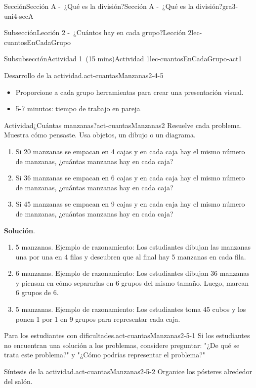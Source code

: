 \documentclass[oneside,10pt,]{article}
\newcommand{\blocktitlefont}{\relax}
\begin{document}
\begin{sectionptx}{Sección}{Sección A -~¿Qué es la división?}{}{Sección A -~¿Qué es la división?}{}{}{gra3-uni4-secA}
\begin{subsectionptx}{Subsección}{Lección 2 -~¿Cuántos hay en cada grupo?}{}{Lección 2}{}{}{lec-cuantosEnCadaGrupo}
\begin{subsubsectionptx}{Subsubsección}{Actividad 1~(15 mins)}{}{Actividad 1}{}{}{lec-cuantosEnCadaGrupo-act1}
\begin{paragraphs}{Desarrollo de la actividad.}{act-cuantasManzanas2-4-5}
\begin{itemize}[label=\textbullet]
\item{}Proporcione a cada grupo herramientas para crear una presentación visual.%
\item{}5-7 minutos: tiempo de trabajo en pareja%
\end{itemize}
\end{paragraphs}%
\begin{activity}{Actividad}{¿Cuántas manzanas?}{act-cuantasManzanas2}%
Resuelve cada problema. Muestra cómo pensaste. Usa objetos, un dibujo o un diagrama.%
\par
%
\begin{enumerate}
\item{}Si 20 manzanas se empacan en 4 cajas y en cada caja hay el mismo número de manzanas, ¿cuántas manzanas hay en cada caja?%
\item{}Si 36 manzanas se empacan en 6 cajas y en cada caja hay el mismo número de manzanas, ¿cuántas manzanas hay en cada caja?%
\item{}Si 45 manzanas se empacan en 9 cajas y en cada caja hay el mismo número de manzanas, ¿cuántas manzanas hay en cada caja?%
\end{enumerate}
%
\par\smallskip%
\noindent\textbf{\blocktitlefont Solución}.\hypertarget{act-cuantasManzanas2-3}{}\quad{}%
\begin{enumerate}
\item{}5 manzanas. Ejemplo de razonamiento: Los estudiantes dibujan las manzanas una por una en 4 filas y descubren que al final hay 5 manzanas en cada fila.%
\item{}6 manzanas. Ejemplo de razonamiento: Los estudiantes dibujan 36 manzanas y piensan en cómo separarlas en 6 grupos del mismo tamaño. Luego, marcan 6 grupos de 6.%
\item{}5 manzanas. Ejemplo de razonamiento: Los estudiantes toma 45 cubos y los ponen 1 por 1 en 9 grupos para representar cada caja.%
\end{enumerate}
\end{activity}%
\par
\begin{paragraphs}{Para los estudiantes con dificultades.}{act-cuantasManzanas2-5-1}%
Si los estudiantes no encuentran una solución a los problemas, considere preguntar: "¿De qué se trata este problema?" y "¿Cómo podrías representar el problema?"%
\end{paragraphs}%
\begin{paragraphs}{Síntesis de la actividad.}{act-cuantasManzanas2-5-2}%
Organice los pósteres alrededor del salón.%

\end{paragraphs}
\end{subsubsectionptx}
\end{subsectionptx}
\end{sectionptx}
\end{document}
